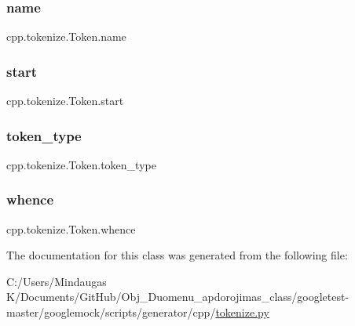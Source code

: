 \mbox{\label{classcpp_1_1tokenize_1_1_token_a90859dd16bde71bc38f717f5119e63b9}} 
\subsubsection{\texorpdfstring{name}{name}}
{\footnotesize\ttfamily cpp.\+tokenize.\+Token.\+name}

\mbox{\label{classcpp_1_1tokenize_1_1_token_a8ec48e348ff29901857cb21553da464b}} 
\subsubsection{\texorpdfstring{start}{start}}
{\footnotesize\ttfamily cpp.\+tokenize.\+Token.\+start}

\mbox{\label{classcpp_1_1tokenize_1_1_token_a60c6e5120f3947885f10788ceb69a660}} 
\subsubsection{\texorpdfstring{token\_type}{token\_type}}
{\footnotesize\ttfamily cpp.\+tokenize.\+Token.\+token\+\_\+type}

\mbox{\label{classcpp_1_1tokenize_1_1_token_a9d3a8011707ede6be85987d74f88848d}} 
\subsubsection{\texorpdfstring{whence}{whence}}
{\footnotesize\ttfamily cpp.\+tokenize.\+Token.\+whence}



The documentation for this class was generated from the following file\+:\begin{DoxyCompactItemize}
\item 
C\+:/\+Users/\+Mindaugas K/\+Documents/\+Git\+Hub/\+Obj\+\_\+\+Duomenu\+\_\+apdorojimas\+\_\+class/googletest-\/master/googlemock/scripts/generator/cpp/\mbox{\hyperlink{googletest-master_2googlemock_2scripts_2generator_2cpp_2tokenize_8py}{tokenize.\+py}}\end{DoxyCompactItemize}

